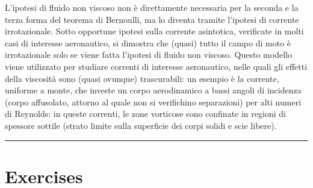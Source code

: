 \documentclass[letterpaper,10pt,italian]{jupyterBook}
\begin{document}
\sphinxAtStartPar
L’ipotesi di fluido non viscoso non è direttamente necessaria per la
seconda e la terza forma del teorema di Bernoulli, ma lo diventa tramite
l’ipotesi di corrente irrotazionale. Sotto opportune ipotesi sulla
corrente asintotica, verificate in molti casi di interesse aeronautico,
si dimostra che (quasi) tutto il campo di moto è irrotazionale solo se
viene fatta l’ipotesi di fluido non viscoso. Questo modello viene
utilizzato per studiare correnti di interesse aeronautico, nelle quali
gli effetti della viscosità sono (quasi ovunque) trascurabili: un
esempio è la corrente, uniforme a monte, che investe un corpo
aerodinamico a bassi angoli di incidenza (corpo affusolato, attorno al
quale non si verifichino separazioni) per alti numeri di Reynolds: in
queste correnti, le zone vorticose sono confinate in regioni di spessore
sottile (strato limite sulla superficie dei corpi solidi e scie libere).


\bigskip\hrule\bigskip


\sphinxstepscope


\section{Exercises}
\label{\detokenize{polimi/fluidmechanics-ita/template/capitoli/05_bernoulli/exercises:exercises}}\label{\detokenize{polimi/fluidmechanics-ita/template/capitoli/05_bernoulli/exercises:fluid-mechanics-bernoulli-exercises}}\label{\detokenize{polimi/fluidmechanics-ita/template/capitoli/05_bernoulli/exercises::doc}}
\sphinxstepscope
\end{document}
